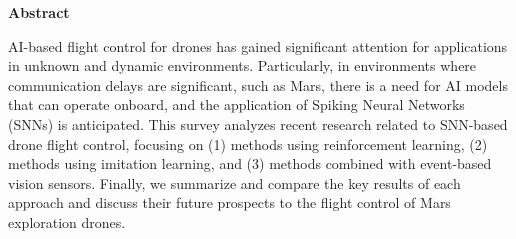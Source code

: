 \documentclass[a4paper,10.5pt,dvipdfmx]{bxjsarticle}
\begin{document}
\thispagestyle{fancy}

\noindent
{}

\vspace{5mm}

\begin{center}
  \bfseries Abstract
\end{center}
AI-based flight control for drones has gained significant attention for applications in unknown and dynamic environments. 
Particularly, in environments where communication delays are significant, such as Mars, there is a need for AI models that
can operate onboard, and the application of Spiking Neural Networks (SNNs) is anticipated. This survey analyzes recent research
related to SNN-based drone flight control, focusing on (1) methods using reinforcement learning, (2) methods using imitation learning,
and (3) methods combined with event-based vision sensors. Finally, we summarize and compare the key results of each approach and
discuss their future prospects to the flight control of Mars exploration drones.
\end{document}
